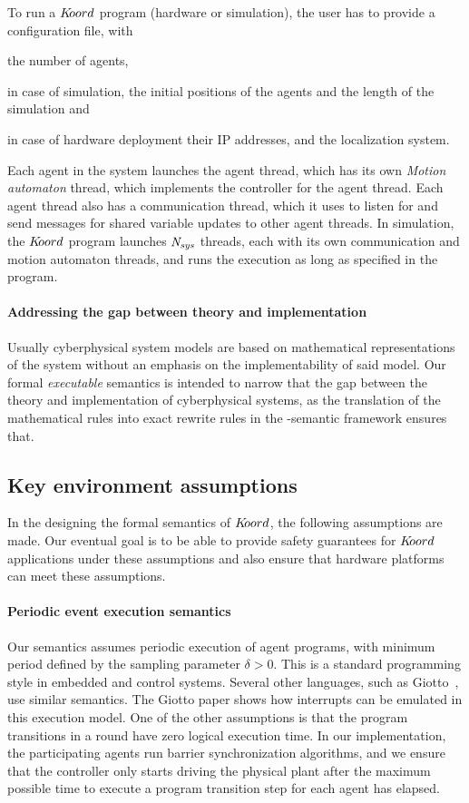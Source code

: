 To run a $K\kern-2pt oord$ program (hardware or simulation), the user has to provide a configuration file, with 
\begin{inparaenum}
\item the number of agents, 
\item in case of simulation, the initial positions of the agents and the length of the simulation and 
\item in case of hardware deployment their IP addresses, 
and the localization system.
\end{inparaenum} 
Each agent in the system launches the agent thread, which has its own \emph{Motion automaton} thread, which implements the controller for the agent thread. Each agent thread also has a communication thread, which it uses to listen for and send messages for shared variable updates to other agent threads. In simulation, the $K\kern-2pt oord$ program launches $\mathit{N_{sys}}$ threads, each with its own communication and motion automaton threads, and runs the execution as long as specified in the program.


\paragraph{Addressing the gap between theory and implementation}

Usually cyberphysical system models are based on mathematical representations of the system without an emphasis on the implementability of said model. Our formal \emph{executable} semantics is intended to narrow that the gap between the theory and implementation of cyberphysical systems, as the translation of the mathematical rules into exact rewrite rules in the \K-semantic framework ensures that.


\subsection{Key environment assumptions} 
In the designing the formal semantics of $K\kern-2pt oord$, the following assumptions are made. Our eventual goal is to be able to  provide safety guarantees for $K\kern-2pt oord$ applications under these assumptions and also ensure that hardware platforms can meet these assumptions. 


\paragraph*{Periodic event execution semantics}
 Our semantics assumes periodic execution of agent programs, with minimum period defined by the sampling parameter $\delta>0$. This is a standard programming style in embedded and control systems. Several other languages, such as Giotto~\cite{henzinger2003giotto}, use similar semantics. The Giotto paper shows how interrupts can be emulated in this execution model. One of the other assumptions is that the program transitions in a round have  zero logical execution time. In our implementation, the participating agents run barrier synchronization algorithms, and we ensure that the controller only starts driving the physical plant after the maximum possible time to execute a program transition step for each agent has elapsed. 


